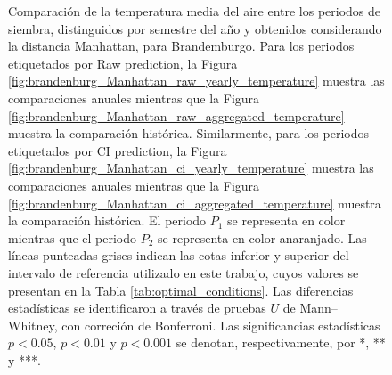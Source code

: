 \begin{figure}[htbp]
	\caption{
		Comparación de la temperatura media del aire entre los periodos de siembra, distinguidos por semestre del año y obtenidos considerando la distancia Manhattan, para Brandemburgo. Para los periodos etiquetados por Raw prediction, la Figura \ref{fig:brandenburg_Manhattan_raw_yearly_temperature} muestra las comparaciones anuales mientras que la Figura \ref{fig:brandenburg_Manhattan_raw_aggregated_temperature} muestra la comparación histórica. Similarmente, para los periodos etiquetados por CI prediction, la Figura \ref{fig:brandenburg_Manhattan_ci_yearly_temperature} muestra las comparaciones anuales mientras que la Figura \ref{fig:brandenburg_Manhattan_ci_aggregated_temperature} muestra la comparación histórica. El periodo $P_1$ se representa en color mientras que el periodo $P_2$ se representa en color anaranjado. Las líneas punteadas grises indican las cotas inferior y superior del intervalo de referencia utilizado en este trabajo, cuyos valores se presentan en la Tabla \ref{tab:optimal_conditions}. Las diferencias estadísticas se identificaron a través de pruebas $U$ de Mann--Whitney, con correción de Bonferroni. Las significancias estadísticas $p<0.05$, $p<0.01$ y $p<0.001$ se denotan, respectivamente, por *, ** y ***.
	}
	\label{fig:brandenburg_Manhattan_average_temperature}
	
	
\end{figure}




